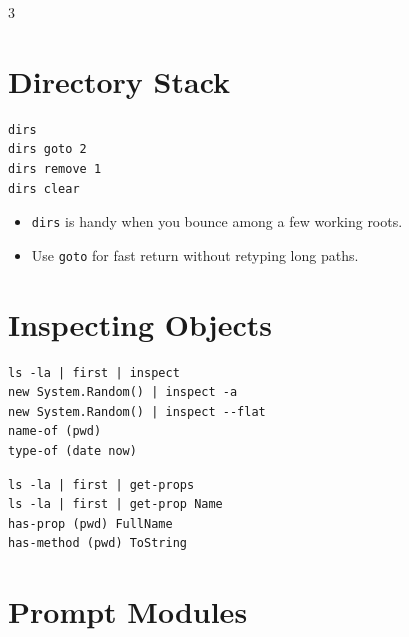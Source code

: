 \begin{multicols*}{3}
\section{Directory Stack}
\begin{lstlisting}
dirs
dirs goto 2
dirs remove 1
dirs clear
\end{lstlisting}

\begin{itemize}
\item \texttt{dirs} is handy when you bounce among a few working roots.
\item Use \texttt{goto} for fast return without retyping long paths.
\end{itemize}

\columnbreak

\section{Inspecting Objects}
\begin{lstlisting}
ls -la | first | inspect
new System.Random() | inspect -a
new System.Random() | inspect --flat
name-of (pwd)
type-of (date now)
\end{lstlisting}

\begin{lstlisting}
ls -la | first | get-props
ls -la | first | get-prop Name
has-prop (pwd) FullName
has-method (pwd) ToString
\end{lstlisting}


\section{Prompt Modules}


\end{multicols*}
